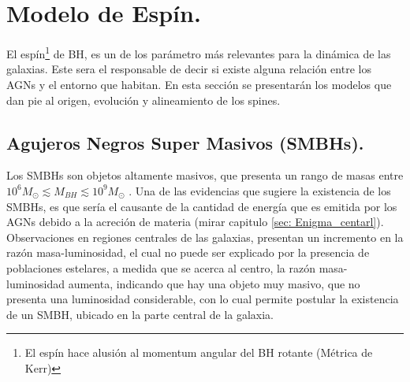 \begin{savequote}[50mm]
\end{savequote}




\chapter{Modelo de Espín.}
\label{cha:Modelo de Spin}

El espín\footnote{El espín hace alusión al momentum angular del BH  rotante (Métrica de Kerr)} de BH, es un de los parámetro más relevantes para la dinámica de las galaxias. Este sera el responsable de decir si existe alguna relación entre los AGNs y el entorno que habitan. En esta sección se presentarán los modelos que dan pie al origen, evolución y  alineamiento de los spines.

\section{Agujeros Negros Super Masivos (SMBHs).}
\label{sec: SMBH}
Los SMBHs son objetos altamente masivos, que presenta un rango de masas entre $10^6M_{\odot}\lesssim M_{BH} \lesssim 10^{9}M_{\odot}$ \cite{mo2010}. Una de las evidencias que sugiere la existencia de los SMBHs, es que sería el causante de la cantidad de energía que es emitida por los AGNs debido a la acreción de materia (mirar capitulo \ref{sec: Enigma_centarl}). Observaciones en regiones centrales de las galaxias, presentan un incremento en la razón masa-luminosidad, el cual no puede ser explicado por la presencia de poblaciones estelares, a medida que se acerca al centro, la razón masa-luminosidad aumenta, indicando que hay una objeto muy masivo, que no presenta una luminosidad considerable, con lo cual permite postular la existencia de un SMBH, ubicado en la parte central de la galaxia.  

